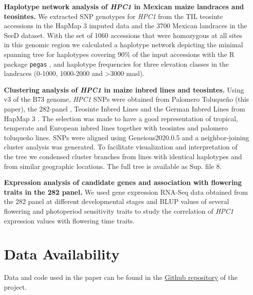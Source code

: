 \documentclass[9pt,twocolumn,twoside,lineno]{BioRxiv}
\def\code#1{\texttt{#1}}
\begin{document}
\textbf{Haplotype network analysis of \textit{HPC1} in Mexican maize landraces and teosintes.}
We extracted SNP genotypes for \textit{HPC1} from the TIL teosinte accessions in the HapMap 3 imputed data \cite{Bukowski2017-ng} and the 3700 Mexican landraces in the SeeD dataset. 
With the set of 1060 accessions that were homozygous at all sites in this genomic region we calculated a haplotype network depicting the minimal spanning tree for haplotypes covering 90\% of the input accessions with the R package \code{pegas} \cite{paradis2010}, and haplotype frequencies for three elevation classes in the landraces (0-1000, 1000-2000 and >3000 masl).

\textbf{Clustering analysis of \textit{HPC1} in maize inbred lines and teosintes.}
Using v3 of the B73 genome, \textit{HPC1} SNPs were obtained from Palomero Toluqueño (this paper), the 282-panel \cite{Flint-Garcia2005-hb}, Teosinte Inbred Lines and the German Inbred Lines from HapMap 3 \cite{Bukowski2017-ng}. 
The selection was made to have a good representation of tropical, temperate and European inbred lines together with teosintes and palomero toluqueño lines.
SNPs were aligned using Geneious2020.0.5 and a neighbor-joining cluster analysis was generated. 
To facilitate visualization and interpretation of the tree we condensed cluster branches from lines with identical haplotypes and from similar geographic locations. 
The full tree is available as Sup. file 8. 

\textbf{Expression analysis of candidate genes and association with flowering traits in the 282 panel.}
We used gene expression RNA-Seq data obtained from the 282 panel at different developmental stages \cite{Kremling2018-gn} and BLUP values of several flowering and photoperiod sensitivity traits \cite{Hung2012-ms} to study the correlation of \textit{HPC1} expression values with flowering time traits.  

\section{Data Availability}
Data and code used in the paper can be found in the \href{https://github.com/sawers-rellan-labs/genetics-phospholipids-highlands}{Github repository} of the project. 
\end{document}
